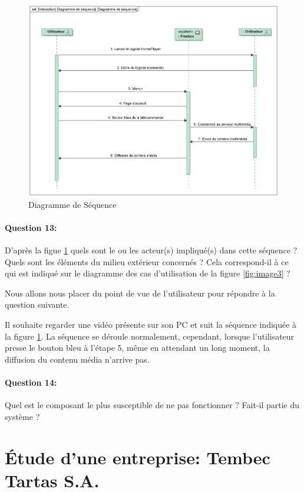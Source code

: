 \begin{figure}[!h]
\begin{center}
\includegraphics[width=0.9\linewidth]{img/Freebox_sequence}
\caption{Diagramme de Séquence}
\label{fig:image4}
\end{center}
\end{figure}

\paragraph{Question 13:} D'après la figue \ref{fig:image4} quels sont le ou les acteur(s) impliqué(s) dans cette séquence ? Quels sont les éléments du milieu extérieur concernés ? Cela correspond-il à ce qui est indiqué sur le diagramme des cas d'utilisation de la figure \ref{fig:image3} ?

Nous allons nous placer du point de vue de l'utilisateur pour répondre à la question suivante.

Il souhaite regarder une vidéo présente sur son PC et suit la séquence indiquée à la figure \ref{fig:image4}. La séquence se déroule normalement, cependant, lorsque l'utilisateur presse le bouton bleu à l'étape 5, même en attendant un long moment, la diffusion du contenu média n'arrive pas.

\paragraph{Question 14:} Quel est le composant le plus susceptible de ne pas fonctionner ? Fait-il partie du système ?

\newpage

\section{Étude d'une entreprise: Tembec Tartas S.A.}


